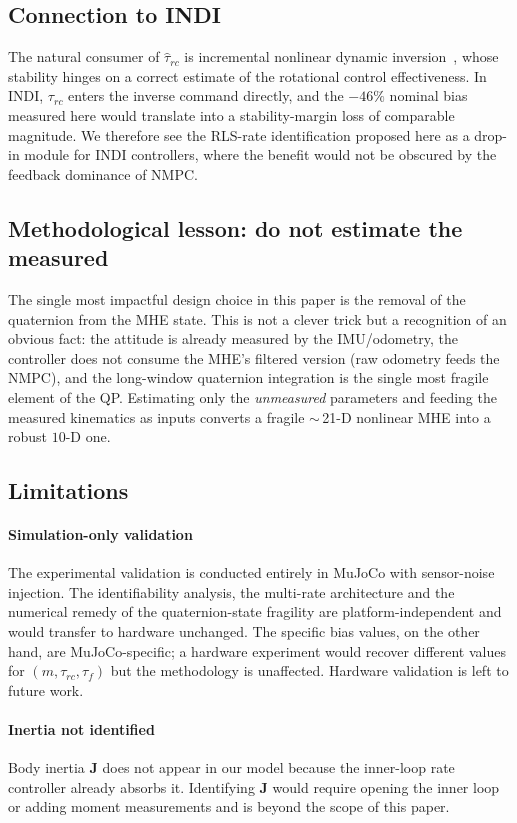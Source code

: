 \documentclass[lettersize,journal]{IEEEtran}
\newcommand{\mat}[1]{\mathbf{#1}}
\begin{document}
\subsection{Connection to INDI}
The natural consumer of $\hat\tau_{rc}$ is incremental nonlinear
dynamic inversion~\cite{smeur2016adaptive,sun2022comparative},
whose stability hinges on a correct estimate of the rotational
control effectiveness.  In INDI, $\tau_{rc}$ enters the inverse
command directly, and the $-46\%$ nominal bias measured here
would translate into a stability-margin loss of comparable
magnitude.  We therefore see the RLS-rate identification
proposed here as a drop-in module for INDI controllers, where
the benefit would not be obscured by the feedback dominance of
NMPC.

\subsection{Methodological lesson: do not estimate the measured}
The single most impactful design choice in this paper is the
removal of the quaternion from the MHE state.  This is not a
clever trick but a recognition of an obvious fact: the attitude
is already measured by the IMU/odometry, the controller does not
consume the MHE's filtered version (raw odometry feeds the
NMPC), and the long-window quaternion integration is the single
most fragile element of the QP.  Estimating only the
\emph{unmeasured} parameters and feeding the measured kinematics
as inputs converts a fragile $\sim$\,21-D nonlinear MHE into a
robust $10$-D one.

\subsection{Limitations}
\paragraph*{Simulation-only validation}
The experimental validation is conducted entirely in MuJoCo
with sensor-noise injection.  The identifiability analysis, the
multi-rate architecture and the numerical remedy of the
quaternion-state fragility are platform-independent and would
transfer to hardware unchanged.  The specific bias values, on
the other hand, are MuJoCo-specific; a hardware experiment would
recover different values for $(m,\tau_{rc},\tau_f)$ but the
methodology is unaffected.  Hardware validation is left to
future work.
\paragraph*{Inertia not identified}
Body inertia $\mat J$ does not appear in our model because the
inner-loop rate controller already absorbs it.  Identifying
$\mat J$ would require opening the inner loop or adding moment
measurements and is beyond the scope of this paper.
\end{document}
